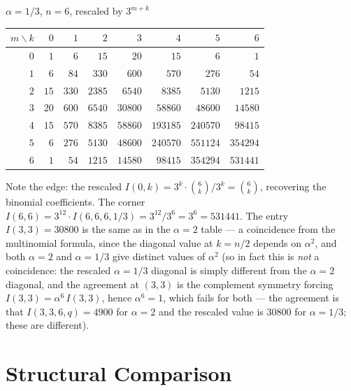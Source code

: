 \documentclass[11pt,a4paper]{article}
\theoremstyle{plain}
\theoremstyle{definition}
\begin{document}
\begin{tcolorbox}[colback=black!5, colframe=black!5, boxrule=0pt,
  sharp corners]
\begin{center}
$\alpha = 1/3$, $n = 6$, rescaled by $3^{m+k}$

\medskip
\begin{tabular}{r|rrrrrrr}
$m \!\backslash\! k$ & $0$ & $1$ & $2$ & $3$ & $4$ & $5$ & $6$ \\
\hline
$0$ & $1$ & $6$ & $15$ & $20$ & $15$ & $6$ & $1$ \\
$1$ & $6$ & $84$ & $330$ & $600$ & $570$ & $276$ & $54$ \\
$2$ & $15$ & $330$ & $2385$ & $6540$ & $8385$ & $5130$ & $1215$ \\
$3$ & $20$ & $600$ & $6540$ & $30800$ & $58860$ & $48600$ & $14580$ \\
$4$ & $15$ & $570$ & $8385$ & $58860$ & $193185$ & $240570$ & $98415$ \\
$5$ & $6$ & $276$ & $5130$ & $48600$ & $240570$ & $551124$ & $354294$ \\
$6$ & $1$ & $54$ & $1215$ & $14580$ & $98415$ & $354294$ & $531441$ \\
\end{tabular}
\end{center}
\end{tcolorbox}

\begin{tcolorbox}[colback=yellow!10, colframe=yellow!10, boxrule=0pt,
  sharp corners]
Note the edge: the rescaled $I(0,k) = 3^k \cdot \binom{6}{k}/3^k
= \binom{6}{k}$, recovering the binomial coefficients.
The corner $I(6,6) = 3^{12} \cdot I(6,6,6,1/3)
= 3^{12}/3^6 = 3^6 = 531441$. The entry $I(3,3) = 30800$ is the
same as in the $\alpha = 2$ table --- a coincidence from the
multinomial formula, since the diagonal value at $k = n/2$ depends
on $\alpha^2$, and both $\alpha = 2$ and $\alpha = 1/3$ give distinct
values of $\alpha^2$ (so in fact this is \emph{not} a coincidence:
the rescaled $\alpha = 1/3$ diagonal is simply different from the
$\alpha = 2$ diagonal, and the agreement at $(3,3)$ is the
complement symmetry forcing $I(3,3) = \alpha^6\, I(3,3)$,
hence $\alpha^6 = 1$, which fails for both --- the agreement is that
$I(3,3,6,q) = 4900$ for $\alpha = 2$ and the rescaled value is
$30800$ for $\alpha = 1/3$; these are different).
\end{tcolorbox}


\section{Structural Comparison}
\end{document}
